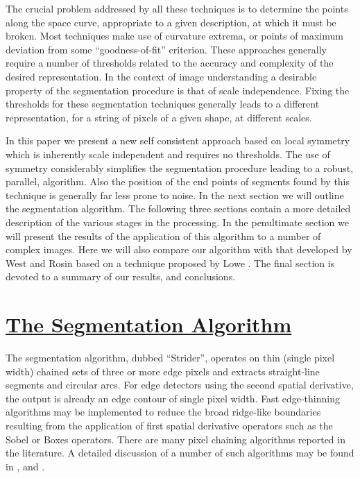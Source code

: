  The crucial problem addressed by all these techniques is to determine
the points along the space curve, appropriate to a given description, at which 
it must be broken. Most techniques make use of curvature extrema, or points of 
maximum deviation from some ``goodness-of-fit'' criterion. These approaches 
generally require a number of thresholds related to the accuracy and
complexity of the desired representation. In the context of image
understanding a desirable property of the segmentation procedure is that of 
scale independence. Fixing the thresholds for these segmentation techniques 
generally leads to a different representation, for a string of pixels of a 
given shape, at different scales. 

 In this paper we present a new self consistent approach based on local 
symmetry which is inherently scale independent and requires no thresholds. 
The use of symmetry considerably simplifies the segmentation procedure leading 
to a robust, parallel, algorithm. Also the position of the end points of 
segments found by this technique is generally far less prone to noise. In the 
next section we will outline the segmentation algorithm. The following three 
sections contain a more detailed description of the various stages in the
processing. In the penultimate section we will present the results of the 
application of this algorithm to a number of complex images. Here we will also 
compare our algorithm with that developed by West and Rosin \cite{west91} 
based on a technique proposed by Lowe \cite{lowe87}. The final section is 
devoted to a summary of our results, and conclusions.

\section{\underline{The Segmentation Algorithm}}

 The segmentation algorithm, dubbed ``Strider'', operates on thin (single 
pixel width) chained sets of three or more edge pixels and extracts 
straight-line segments and circular arcs. For edge detectors using the second 
spatial derivative, the output is already an edge contour of single pixel 
width. Fast edge-thinning algorithms \cite{dyer79} may be implemented to 
reduce the broad ridge-like boundaries resulting from the application of 
first spatial derivative operators such as the Sobel or Boxes operators. There 
are many pixel chaining algorithms reported in the literature. A detailed 
discussion of a number of such algorithms may be found in \cite{rosenfeld82}, 
and \cite{ballard82}. 


